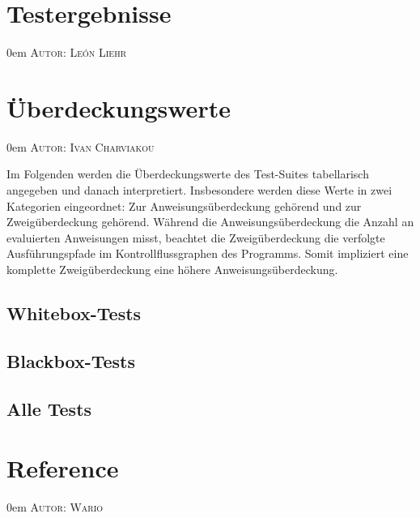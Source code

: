 \documentclass{article}
\makeatletter
\newcommand{\sectionauthor}[1]{
	{\parindent 0em \large \scshape Autor: #1 \par \nobreak \vspace*{1em}}
	\@afterheading
}
\makeatother
\begin{document}
\newpage

\section{Testergebnisse}
\sectionauthor{León Liehr}



\newpage

\section{Überdeckungswerte}
\sectionauthor{Ivan Charviakou}

Im Folgenden werden die Überdeckungswerte des Test-Suites tabellarisch angegeben und danach interpretiert. 
Insbesondere werden diese Werte in zwei Kategorien eingeordnet: Zur Anweisungsüberdeckung gehörend und zur Zweigüberdeckung gehörend. 
Während die Anweisungsüberdeckung die Anzahl an evaluierten Anweisungen misst, beachtet die Zweigüberdeckung die verfolgte Ausführungspfade im Kontrollflussgraphen des Programms.
Somit impliziert eine komplette Zweigüberdeckung eine höhere Anweisungsüberdeckung. 

\subsection{Whitebox-Tests}

\subsection{Blackbox-Tests}

\subsection{Alle Tests}

\newpage

\section{Reference}
\sectionauthor{Wario}
\end{document}
